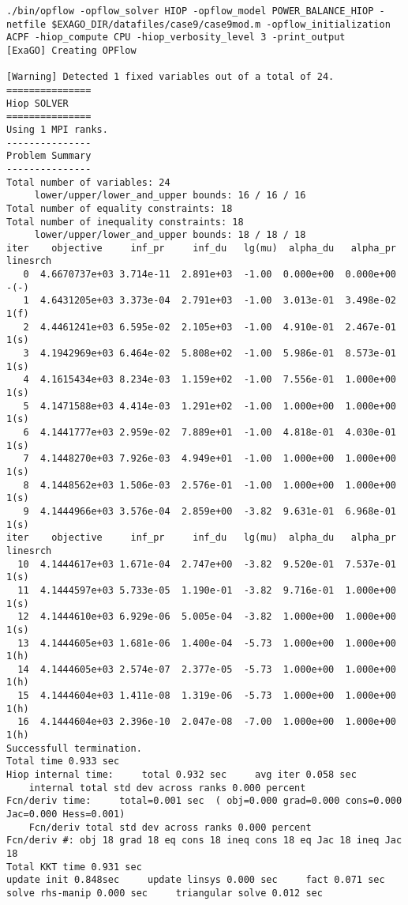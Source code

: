 \begin{lstlisting}
./bin/opflow -opflow_solver HIOP -opflow_model POWER_BALANCE_HIOP -netfile $EXAGO_DIR/datafiles/case9/case9mod.m -opflow_initialization ACPF -hiop_compute CPU -hiop_verbosity_level 3 -print_output
[ExaGO] Creating OPFlow

[Warning] Detected 1 fixed variables out of a total of 24.
===============
Hiop SOLVER
===============
Using 1 MPI ranks.
---------------
Problem Summary
---------------
Total number of variables: 24
     lower/upper/lower_and_upper bounds: 16 / 16 / 16
Total number of equality constraints: 18
Total number of inequality constraints: 18
     lower/upper/lower_and_upper bounds: 18 / 18 / 18
iter    objective     inf_pr     inf_du   lg(mu)  alpha_du   alpha_pr linesrch
   0  4.6670737e+03 3.714e-11  2.891e+03  -1.00  0.000e+00  0.000e+00  -(-)
   1  4.6431205e+03 3.373e-04  2.791e+03  -1.00  3.013e-01  3.498e-02  1(f)
   2  4.4461241e+03 6.595e-02  2.105e+03  -1.00  4.910e-01  2.467e-01  1(s)
   3  4.1942969e+03 6.464e-02  5.808e+02  -1.00  5.986e-01  8.573e-01  1(s)
   4  4.1615434e+03 8.234e-03  1.159e+02  -1.00  7.556e-01  1.000e+00  1(s)
   5  4.1471588e+03 4.414e-03  1.291e+02  -1.00  1.000e+00  1.000e+00  1(s)
   6  4.1441777e+03 2.959e-02  7.889e+01  -1.00  4.818e-01  4.030e-01  1(s)
   7  4.1448270e+03 7.926e-03  4.949e+01  -1.00  1.000e+00  1.000e+00  1(s)
   8  4.1448562e+03 1.506e-03  2.576e-01  -1.00  1.000e+00  1.000e+00  1(s)
   9  4.1444966e+03 3.576e-04  2.859e+00  -3.82  9.631e-01  6.968e-01  1(s)
iter    objective     inf_pr     inf_du   lg(mu)  alpha_du   alpha_pr linesrch
  10  4.1444617e+03 1.671e-04  2.747e+00  -3.82  9.520e-01  7.537e-01  1(s)
  11  4.1444597e+03 5.733e-05  1.190e-01  -3.82  9.716e-01  1.000e+00  1(s)
  12  4.1444610e+03 6.929e-06  5.005e-04  -3.82  1.000e+00  1.000e+00  1(s)
  13  4.1444605e+03 1.681e-06  1.400e-04  -5.73  1.000e+00  1.000e+00  1(h)
  14  4.1444605e+03 2.574e-07  2.377e-05  -5.73  1.000e+00  1.000e+00  1(h)
  15  4.1444604e+03 1.411e-08  1.319e-06  -5.73  1.000e+00  1.000e+00  1(h)
  16  4.1444604e+03 2.396e-10  2.047e-08  -7.00  1.000e+00  1.000e+00  1(h)
Successfull termination.
Total time 0.933 sec 
Hiop internal time:     total 0.932 sec     avg iter 0.058 sec 
    internal total std dev across ranks 0.000 percent
Fcn/deriv time:     total=0.001 sec  ( obj=0.000 grad=0.000 cons=0.000 Jac=0.000 Hess=0.001) 
    Fcn/deriv total std dev across ranks 0.000 percent
Fcn/deriv #: obj 18 grad 18 eq cons 18 ineq cons 18 eq Jac 18 ineq Jac 18
Total KKT time 0.931 sec 
update init 0.848sec     update linsys 0.000 sec     fact 0.071 sec 
solve rhs-manip 0.000 sec     triangular solve 0.012 sec 


\end{lstlisting}
